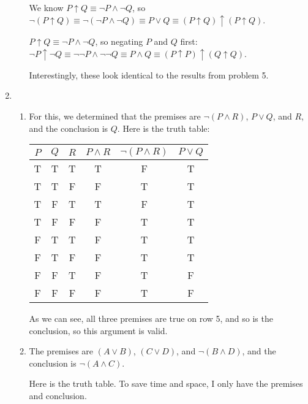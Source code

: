\documentclass{article}
\begin{document}
\begin{enumerate}
\begin{enumerate}
    We know $P \uparrow Q \equiv \lnot P \land \lnot Q$, so $\lnot (P \uparrow Q) \equiv \lnot (\lnot P \land \lnot Q) \equiv P \lor Q \equiv (P \uparrow Q) \uparrow (P \uparrow Q)$.

    $P \uparrow Q \equiv \lnot P \land \lnot Q$, so negating $P$ and $Q$ first: $\lnot P \uparrow \lnot Q \equiv \lnot \lnot P \land \lnot \lnot Q \equiv P \land Q \equiv (P \uparrow P) \uparrow (Q \uparrow Q)$.

    Interestingly, these look identical to the results from problem 5.
  \end{enumerate}
  \item
  \begin{enumerate}
  \item
    For this, we determined that the premises are $\lnot (P \land R)$, $P \lor Q$, and $R$, and the conclusion is $Q$.	Here is the truth table:

    \begin{tabular}{c c c c c c}
      $P$ & $Q$ & $R$ & $P \land R$ & $\lnot (P \land R)$ & $P \lor Q$ \\ \hline
      T & T & T & T & F & T \\
      T & T & F & F & T & T \\
      T & F & T & T & F & T \\
      T & F & F & F & T & T \\
      F & T & T & F & T & T \\
      F & T & F & F & T & T \\
      F & F & T & F & T & F \\
      F & F & F & F & T & F \\
    \end{tabular}

    As we can see, all three premises are true on row 5, and so is the conclusion, so this argument is valid.

  \item
    The premises are $(A \lor B)$, $(C \lor D)$, and $\lnot (B \land D)$, and the conclusion is $\lnot (A \land C)$.

    Here is the truth table.  To save time and space, I only have the premises and conclusion.


\end{enumerate}
\end{enumerate}
\end{document}
